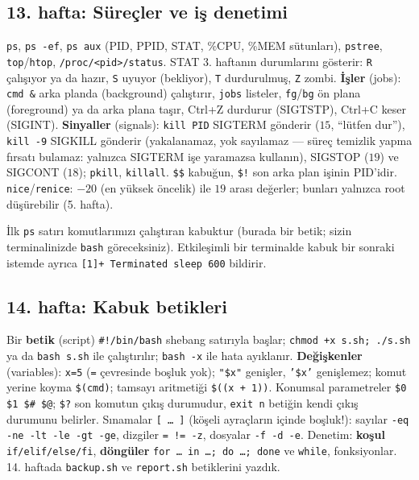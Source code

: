 \documentclass[11pt,a4paper]{article}
\newcommand{\term}[1]{\textbf{\color{mintdeep}#1}}
\newcommand{\cmd}[1]{\texttt{#1}}
\begin{document}
\subsection{13. hafta: Süreçler ve iş denetimi}
\cmd{ps}, \cmd{ps -ef}, \cmd{ps aux} (PID, PPID, STAT, \%CPU, \%MEM sütunları), \cmd{pstree}, \cmd{top}/\cmd{htop}, \texttt{/proc/<pid>/status}. STAT 3. haftanın durumlarını gösterir: \texttt{R} çalışıyor ya da hazır, \texttt{S} uyuyor (bekliyor), \texttt{T} durdurulmuş, \texttt{Z} zombi. \term{İşler} (jobs): \cmd{cmd \&} arka planda (background) çalıştırır, \cmd{jobs} listeler, \cmd{fg}/\cmd{bg} ön plana (foreground) ya da arka plana taşır, Ctrl+Z durdurur (SIGTSTP), Ctrl+C keser (SIGINT). \term{Sinyaller} (signals): \cmd{kill PID} SIGTERM gönderir ($15$, ``lütfen dur''), \cmd{kill -9} SIGKILL gönderir (yakalanamaz, yok sayılamaz --- süreç temizlik yapma fırsatı bulamaz: yalnızca SIGTERM işe yaramazsa kullanın), SIGSTOP ($19$) ve SIGCONT ($18$); \cmd{pkill}, \cmd{killall}. \texttt{\$\$} kabuğun, \texttt{\$!} son arka plan işinin PID'idir. \cmd{nice}/\cmd{renice}: $-20$ (en yüksek öncelik) ile $19$ arası değerler; bunları yalnızca root düşürebilir (5. hafta).

İlk \cmd{ps} satırı komutlarımızı çalıştıran kabuktur (burada bir betik; sizin terminalinizde \texttt{bash} göreceksiniz). Etkileşimli bir terminalde kabuk bir sonraki istemde ayrıca \texttt{[1]+ Terminated sleep 600} bildirir.

\subsection{14. hafta: Kabuk betikleri}
Bir \term{betik} (script) \texttt{\#!/bin/bash} shebang satırıyla başlar; \cmd{chmod +x s.sh; ./s.sh} ya da \cmd{bash s.sh} ile çalıştırılır; \cmd{bash -x} ile hata ayıklanır. \term{Değişkenler} (variables): \texttt{x=5} (\texttt{=} çevresinde boşluk yok); \texttt{"\$x"} genişler, \texttt{'\$x'} genişlemez; komut yerine koyma \texttt{\$(cmd)}; tamsayı aritmetiği \texttt{\$((x + 1))}. Konumsal parametreler \texttt{\$0 \$1 \$\# \$@}; \texttt{\$?} son komutun çıkış durumudur, \cmd{exit n} betiğin kendi çıkış durumunu belirler. Sınamalar \texttt{[ \dots\ ]} (köşeli ayraçların içinde boşluk!): sayılar \texttt{-eq -ne -lt -le -gt -ge}, dizgiler \texttt{= != -z}, dosyalar \texttt{-f -d -e}. Denetim: \term{koşul} \texttt{if/elif/else/fi}, \term{döngüler} \texttt{for \dots\ in \dots; do \dots; done} ve \texttt{while}, fonksiyonlar. 14. haftada \texttt{backup.sh} ve \texttt{report.sh} betiklerini yazdık.

\end{document}
